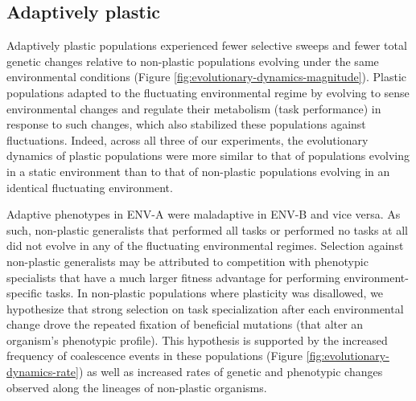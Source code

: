 \subsection{Adaptively plastic}

Adaptively plastic populations experienced fewer selective sweeps and fewer total genetic changes relative to non-plastic populations evolving under the same environmental conditions (Figure \ref{fig:evolutionary-dynamics-magnitude}).
Plastic populations adapted to the fluctuating environmental regime by evolving to sense environmental changes and regulate their metabolism (task performance) in response to such changes, which also stabilized these populations against fluctuations.
Indeed, across all three of our experiments, the evolutionary dynamics of plastic populations were more similar to that of populations evolving in a static environment than to that of non-plastic populations evolving in an identical fluctuating environment.

Adaptive phenotypes in ENV-A were maladaptive in ENV-B and vice versa.
As such, non-plastic generalists that performed all tasks or performed no tasks at all did not evolve in any of the fluctuating environmental regimes.
Selection against non-plastic generalists may be attributed to competition with phenotypic specialists that have a much larger fitness advantage for performing environment-specific tasks.
In non-plastic populations where plasticity was disallowed, we hypothesize that strong selection on task specialization after each environmental change drove the repeated fixation of beneficial mutations (that alter an organism's phenotypic profile).
This hypothesis is supported by the increased frequency of coalescence events in these populations (Figure \ref{fig:evolutionary-dynamics-rate}) as well as increased rates of genetic and phenotypic changes observed along the lineages of non-plastic organisms. 

